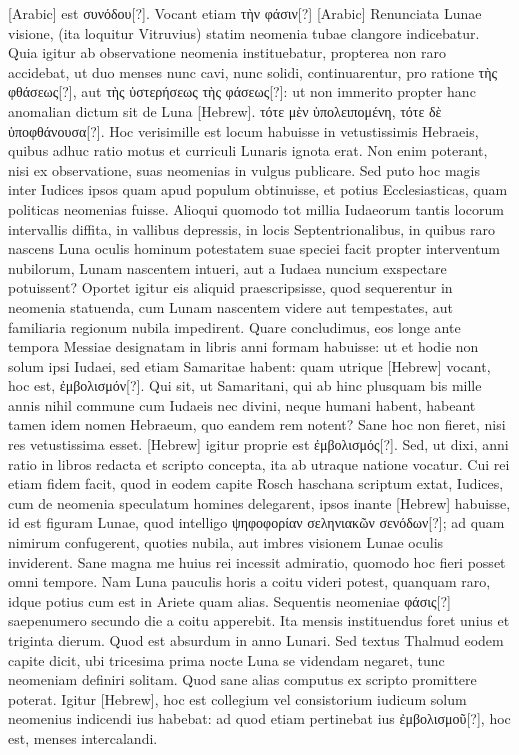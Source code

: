 \textarabic{[Arabic]}
est \textgreek{συνόδου[?]}.
Vocant etiam \textgreek{τὴν φάσιν[?]} \textarabic{[Arabic]}
Renunciata Lunae visione,
(ita loquitur Vitruvius) statim neomenia tubae clangore indicebatur.
Quia igitur ab observatione neomenia instituebatur, propterea non raro
accidebat, ut duo menses nunc cavi, nunc solidi, continuarentur, pro
ratione \textgreek{τὴς φθάσεως[?]},
 aut \textgreek{τὴς ὑστερήσεως τὴς φάσεως[?]}: ut non immerito propter
hanc anomalian dictum sit de Luna \texthebrew{[Hebrew]}.
\textgreek{τότε
μὲν ὑπολειπομένη, τότε δὲ ὑποφθάνουσα[?]}.
Hoc verisimille est locum habuisse
in vetustissimis Hebraeis, quibus adhuc ratio motus et curriculi Lunaris
ignota erat.
Non enim poterant, nisi ex observatione, suas neomenias
in vulgus publicare.
Sed puto hoc magis inter Iudices ipsos
quam apud populum obtinuisse, et potius Ecclesiasticas, quam politicas
neomenias fuisse.
Alioqui quomodo tot millia Iudaeorum tantis
locorum intervallis diffita, in vallibus depressis, in locis Septentrionalibus,
in quibus raro nascens Luna oculis hominum potestatem
suae speciei facit propter interventum nubilorum, Lunam nascentem
intueri, aut a Iudaea nuncium exspectare potuissent?
Oportet igitur
eis aliquid praescripsisse, quod sequerentur in neomenia statuenda,
cum Lunam nascentem videre aut tempestates, aut familiaria regionum
nubila impedirent.
Quare concludimus, eos longe ante tempora
Messiae designatam in libris anni formam habuisse: ut et hodie non
solum ipsi Iudaei, sed etiam Samaritae habent:
 quam utrique \texthebrew{[Hebrew]} vocant,
hoc est, \textgreek{ἐμβολισμόν[?]}.
Qui sit, ut Samaritani, qui ab hinc plusquam
bis mille annis nihil commune cum Iudaeis nec divini, neque humani
habent, habeant tamen idem nomen Hebraeum, quo eandem rem
notent?
Sane hoc non fieret, nisi res vetustissima esset.
\texthebrew{[Hebrew]} igitur proprie
est \textgreek{ἐμβολισμός[?]}.
Sed, ut dixi, anni ratio in libros redacta et scripto
concepta, ita ab utraque natione vocatur.
Cui rei etiam fidem facit,
quod in eodem capite Rosch haschana scriptum extat, Iudices, cum
de neomenia speculatum homines delegarent,
 ipsos inante \texthebrew{[Hebrew]}
habuisse, id est figuram Lunae, quod intelligo
 \textgreek{ψηφοφορίαν σεληνιακῶν
σενόδων[?]};
ad quam nimirum confugerent, quoties nubila, aut imbres
visionem Lunae oculis inviderent.
Sane magna me huius rei incessit
admiratio, quomodo hoc fieri posset omni tempore.
Nam Luna
pauculis horis a coitu videri potest, quanquam raro, idque potius cum
est in Ariete quam alias.
Sequentis neomeniae \textgreek{φάσις[?]} saepenumero secundo
die a coitu apperebit.
Ita mensis instituendus foret unius et
triginta dierum.
Quod est absurdum in anno Lunari.
Sed textus Thalmud
eodem capite dicit, ubi tricesima prima nocte Luna se videndam
negaret, tunc neomeniam definiri solitam.
Quod sane alias computus
ex scripto promittere poterat.
Igitur \texthebrew{[Hebrew]}, hoc est collegium vel
consistorium iudicum solum neomenius indicendi ius habebat: ad
quod etiam pertinebat ius \textgreek{ἐμβολισμοῦ[?]},
 hoc est, menses intercalandi.

